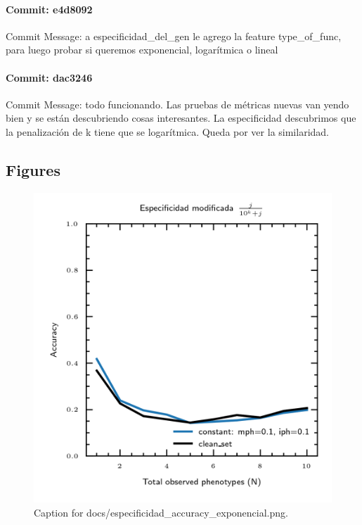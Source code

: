 \documentclass{article}
\begin{document}
\paragraph{Commit: e4d8092}
Commit Message: a especificidad_del_gen le agrego la feature type_of_func, para luego probar si queremos exponencial, logarítmica o lineal

\paragraph{Commit: dac3246}
Commit Message: todo funcionando. Las pruebas de métricas nuevas van yendo bien y se están descubriendo cosas interesantes. La especificidad descubrimos que la penalización de k tiene que se logarítmica. Queda por ver la similaridad.

\subsection{Figures}
\begin{figure}[h] \centering \includegraphics{docs/especificidad_accuracy_exponencial.png} \caption{Caption for docs/especificidad_accuracy_exponencial.png.} \end{figure}
\end{document}
